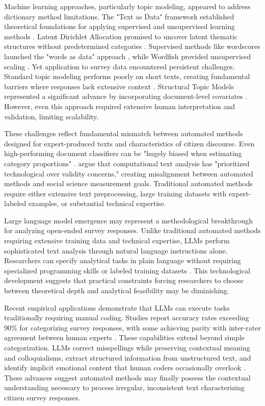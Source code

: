 \documentclass[
  journal=ram,
  manuscript=article-type,
  year=2025,
  volume=unpublished,
]{cup-journal}
\begin{document}
Machine learning approaches, particularly topic modeling, appeared to address dictionary method limitations.
The "Text as Data" framework established theoretical foundations for applying supervised and unsupervised learning methods \citep{grimmer_stewart13}.
Latent Dirichlet Allocation promised to uncover latent thematic structures without predetermined categories \citep{blei_etal03, jelodar_etal19, maier_etal18}.
Supervised methods like wordscores launched the "words as data" approach \citep{laver_etal03}, while Wordfish provided unsupervised scaling \citep{slapin_proksch08}.
Yet application to survey data encountered persistent challenges.
Standard topic modeling performs poorly on short texts, creating fundamental barriers where responses lack extensive context \citep{pietsch_lessmann18}.
Structural Topic Models represented a significant advance by incorporating document-level covariates \citep{roberts_etal14, roberts_etal19}.
However, even this approach required extensive human interpretation and validation, limiting scalability.

These challenges reflect fundamental mismatch between automated methods designed for expert-produced texts and characteristics of citizen discourse.
Even high-performing document classifiers can be "hugely biased when estimating category proportions" \citep{hopkins_king10}.
\citet{baden_etal22} argue that computational text analysis has "prioritized technological over validity concerns," creating misalignment between automated methods and social science measurement goals.
Traditional automated methods require either extensive text preprocessing, large training datasets with expert-labeled examples, or substantial technical expertise.

Large language model emergence may represent a methodological breakthrough for analyzing open-ended survey responses.
Unlike traditional automated methods requiring extensive training data and technical expertise, LLMs perform sophisticated text analysis through natural language instructions alone.
Researchers can specify analytical tasks in plain language without requiring specialized programming skills or labeled training datasets \citep{ziems_etal24, dunivin25}.
This technological development suggests that practical constraints forcing researchers to choose between theoretical depth and analytical feasibility may be diminishing.

Recent empirical applications demonstrate that LLMs can execute tasks traditionally requiring manual coding.
Studies report accuracy rates exceeding 90\% for categorizing survey responses, with some achieving parity with inter-rater agreement between human experts \citep{mellon_etal24, kornblith_etal25, lossio-ventura_etal24}.
These capabilities extend beyond simple categorization.
LLMs correct misspellings while preserving contextual meaning and colloquialisms, extract structured information from unstructured text, and identify implicit emotional content that human coders occasionally overlook \citep{allamong_etal25, dunivin25}.
These advances suggest automated methods may finally possess the contextual understanding necessary to process irregular, inconsistent text characterizing citizen survey responses.
\end{document}
